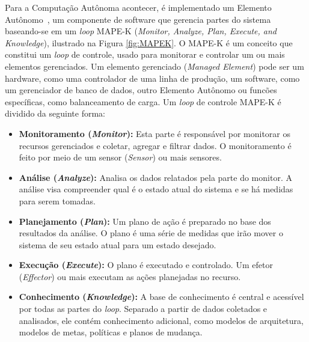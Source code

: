 \documentclass[portugues]{ic-tese}
\begin{document}
Para a Computação Autônoma acontecer, é implementado um Elemento Autônomo~\citep{Abbas_2010}, um componente de software que gerencia partes do sistema baseando-se em um \textit{loop} MAPE-K (\textit{Monitor, Analyze, Plan, Execute, and Knowledge}), ilustrado na Figura \ref{fig:MAPEK}. O MAPE-K é um conceito que constitui um \textit{loop} de controle, usado para monitorar e controlar um ou mais elementos gerenciados. Um elemento gerenciado (\textit{Managed Element}) pode ser um hardware, como uma controlador de uma linha de produção, um software, como um gerenciador de banco de dados, outro Elemento Autônomo ou funcões específicas, como balanceamento de carga. Um \textit{loop} de controle MAPE-K é dividido da seguinte forma:

\begin{itemize}
\item \textbf{Monitoramento (\textit{Monitor}):} Esta parte é responsável por monitorar os recursos gerenciados e coletar, agregar e filtrar dados. O monitoramento é feito por meio de um sensor (\textit{Sensor}) ou mais sensores.
\item \textbf{Análise (\textit{Analyze}):} Analisa os dados relatados pela parte do monitor. A análise visa compreender qual é o estado atual do sistema e se há medidas para serem tomadas.
\item \textbf{Planejamento (\textit{Plan}):} Um plano de ação é preparado no
base dos resultados da análise. O plano é uma série de medidas que irão mover o sistema de seu estado atual para um estado desejado.
\item \textbf{Execução (\textit{Execute}):} O plano é executado e controlado.
Um efetor (\textit{Effector}) ou mais executam as ações planejadas no recurso.
\item \textbf{Conhecimento (\textit{Knowledge}):} A base de conhecimento é central e acessível por todas as partes do \textit{loop}. Separado a partir de dados coletados e analisados, ele contém conhecimento adicional, como modelos de arquitetura, modelos de metas, políticas e planos de mudança.
\end{itemize}
\end{document}
